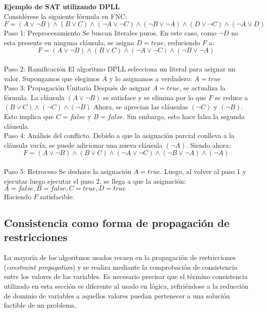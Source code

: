 \documentclass[12pt]{report}
\begin{document}
\textbf{Ejemplo de SAT utilizando DPLL}\\

Considérese la siguiente fórmula en FNC:
$F=(A\lor \neg B)\land(B\lor C)\land(\neg A\lor \neg C)\land(\neg B\lor \neg A)\land(D\lor \neg C)\land(\neg A\lor D)$\\

Paso 1: Preprocesamiento
Se buscan literales puros. En este caso, como $\neg D$ no esta presente en ninguna cláusula, se asigna $D=true$, reduciendo $F$ a:
$$F=(A\lor \neg B)\land(B\lor C)\land(\neg A\lor \neg C)\land(\neg B\lor \neg A)$$\\

Paso 2: Ramificación
El algoritmo DPLL selecciona un literal para asignar un valor. Supongamos que elegimos $A$ y lo asignamos a verdadero:
$A=true$\\

Paso 3: Propagación Unitaria
Después de asignar $A=true$, se actualiza la fórmula. La cláusula $(A\lor \neg B)$ se satisface y se elimina por lo que $F$ se reduce a $(B\lor C)\land(\neg C)\land(\neg B)$
Ahora, se aprecian las cláusulas $(\neg C)$ y $(\neg B)$. Esto implica que $C=false$ y $B=false$. Sin embargo, esto hace falsa la segunda cláusula.\\

Paso 4: Análisis del conflicto.
Debido a que la asignación parcial conlleva a la cláusula vacía, se puede adicionar una nueva cláusula $(\neg A)$. Siendo ahora:
$$F=(A\lor \neg B)\land(B\lor C)\land(\neg A\lor \neg C)\land(\neg B\lor \neg A)\land(\neg A)$$\\

Paso 5: Retroceso
Se deshace la asignación $A=true$. Luego, al volver al paso 1 y ejecutar luego ejecutar el paso 2, se llega a que la asignación:
$A=false, B=false,C=true, D=true$\\

Haciendo $F$ satisfacible.

\subsection{Consistencia como forma de propagación de restricciones\\}

La mayoría de los algoritmos usados recaen en la propagación de restricciones (\textit{constraint propagation}) y se realiza mediante la comprobación de consistencia entre los valores de las variables. Es necesario precisar que el término consistencia utilizado en esta sección es diferente al usado en lógica, refiriéndose a la reducción de dominio de variables a aquellos valores puedan pertenecer a una solución factible de un problema.\\
\end{document}
